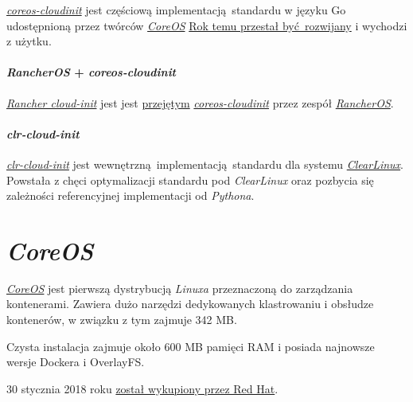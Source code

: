\documentclass[a4paper,12pt,twoside,openany]{report}
\begin{document}
\href{https://github.com/coreos/coreos-cloudinit}{\emph{coreos-cloudinit}}
jest częściową implementacją~standardu w języku Go udostępnioną przez
twórców \protect\hyperlink{coreos}{\emph{CoreOS}}
\href{https://github.com/coreos/coreos-cloudinit/commit/3460ca4414fd91de66cd581d997bf453fd895b67}{Rok
temu przestał być~rozwijany} i wychodzi z użytku.

\hypertarget{rancheros-coreos-cloudinit}{%
\paragraph{\texorpdfstring{\emph{RancherOS} +
\emph{coreos-cloudinit}}{RancherOS + coreos-cloudinit}}\label{rancheros-coreos-cloudinit}}

\href{http://rancher.com/docs/os/latest/en/configuration/}{\emph{Rancher
cloud-init}} jest jest
\href{https://github.com/rancher/os/commit/e2ed97648ad63455743ebc16080a82ee47f8bb0c}{przejętym}
\protect\hyperlink{coreos-cloudinit}{\emph{coreos-cloudinit}} przez
zespół \protect\hyperlink{rancheros}{\emph{RancherOS}}.

\hypertarget{clr-cloud-init}{%
\paragraph{\texorpdfstring{\emph{clr-cloud-init}}{clr-cloud-init}}\label{clr-cloud-init}}

\href{https://clearlinux.org/blogs/announcing-clr-cloud-init}{\emph{clr-cloud-init}}
jest wewnętrzną~implementacją~standardu dla systemu
\protect\hyperlink{clearlinux}{\emph{ClearLinux}}. Powstała z chęci
optymalizacji standardu pod \emph{ClearLinux} oraz pozbycia się
zależności referencyjnej implementacji od \emph{Pythona}.

\hypertarget{coreos}{%
\section{\texorpdfstring{\emph{CoreOS}}{CoreOS}}\label{coreos}}

\href{https://coreos.com/}{\emph{CoreOS}} jest pierwszą dystrybucją
\emph{Linuxa} przeznaczoną do zarządzania kontenerami. Zawiera dużo
narzędzi dedykowanych klastrowaniu i obsłudze kontenerów, w związku z
tym zajmuje 342 MB.

Czysta instalacja zajmuje około 600 MB pamięci RAM i posiada najnowsze
wersje Dockera i OverlayFS.

30 stycznia 2018 roku
\href{https://www.redhat.com/en/about/press-releases/red-hat-acquire-coreos-expanding-its-kubernetes-and-containers-leadership}{został
wykupiony przez Red Hat}.
\end{document}
